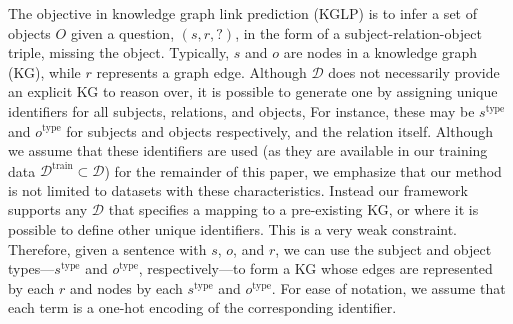The objective in knowledge graph link prediction (KGLP) is to infer a set of objects $O$ given a question, $(s, r, ?)$, in the form of a subject-relation-object triple, missing the object.
Typically, $s$ and $o$ are nodes in a knowledge graph (KG), while $r$ represents a graph edge.
Although $\mathcal{D}$ does not necessarily provide an explicit KG to reason over, it is possible to generate one by assigning unique identifiers for all subjects, relations, and objects, For instance, these may be $s^{\textrm{type}}$ and $o^{\textrm{type}}$ for subjects and objects respectively, and the relation itself.
Although we assume that these identifiers are used 
(as they are available in our training data $\mathcal{D}^{\textrm{train}}\subset \mathcal{D}$)
for the remainder of this paper, we emphasize that our method is not limited to datasets with these characteristics. Instead our framework supports any $\mathcal{D}$ that specifies a mapping to a pre-existing KG, or where it is possible to define other unique identifiers. This is a very weak constraint.
Therefore, given a sentence with $s$, $o$, and $r$, we can use the subject and object types---$s^{\textrm{type}}$ and $o^{\textrm{type}}$, respectively---to form a KG whose edges are represented by each $r$ and nodes by each $s^{\textrm{type}}$ and $o^{\textrm{type}}$.
For ease of notation, we assume that each term is a one-hot encoding of the corresponding identifier.

